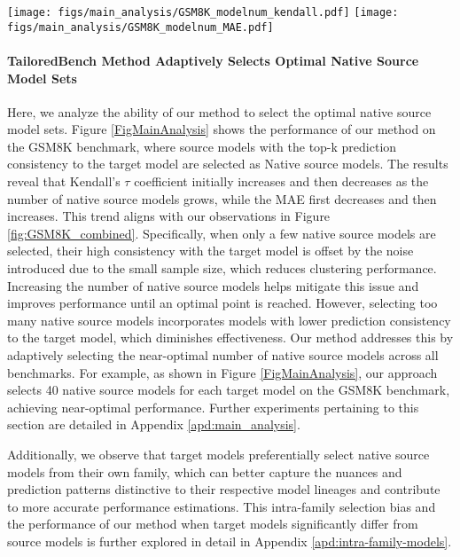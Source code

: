 \begin{figure*}[t]
  \texttt{[image: figs/main\_analysis/GSM8K\_modelnum\_kendall.pdf]} \hfill
  \texttt{[image: figs/main\_analysis/GSM8K\_modelnum\_MAE.pdf]}
  \caption {Performance of \textsc{TailoredBench} with varying numbers of Native Source Models on GSM8K benchmark. The shaded area indicates the adaptively selected number of native source models and the corresponding performance of our method.}
\vspace{-0.4cm}
\label{FigMainAnalysis}
\end{figure*}



\paragraph{TailoredBench Method Adaptively Selects Optimal Native Source Model Sets} Here, we analyze the ability of our method to select the optimal native source model sets. Figure \ref{FigMainAnalysis} shows the performance of our method on the GSM8K benchmark, where source models with the top-k prediction consistency to the target model are selected as Native source models. The results reveal that Kendall's $\tau$ coefficient initially increases and then decreases as the number of native source models grows, while the MAE first decreases and then increases. This trend aligns with our observations in Figure \ref{fig:GSM8K_combined}. Specifically, when only a few native source models are selected, their high consistency with the target model is offset by the noise introduced due to the small sample size, which reduces clustering performance. Increasing the number of native source models helps mitigate this issue and improves performance until an optimal point is reached. However, selecting too many native source models incorporates models with lower prediction consistency to the target model, which diminishes effectiveness. Our method addresses this by adaptively selecting the near-optimal number of native source models across all benchmarks. For example, as shown in Figure \ref{FigMainAnalysis}, our approach selects 40 native source models for each target model on the GSM8K benchmark, achieving near-optimal performance. Further experiments pertaining to this section are detailed in Appendix \ref{apd:main_analysis}.

Additionally, we observe that target models preferentially select native source models from their own family, which can better capture the nuances and prediction patterns distinctive to their respective model lineages and contribute to more accurate performance estimations. This intra-family selection bias and the performance of our method when target models significantly differ from source models is further explored in detail in Appendix \ref{apd:intra-family-models}.

